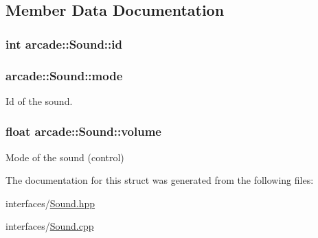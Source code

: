 \subsection{Member Data Documentation}
\hypertarget{structarcade_1_1_sound_a9bee48a44860d44ddb963621ceb9172b}{
\subsubsection[{id}]{ {\bf int} arcade\-::\-Sound\-::id}}\label{structarcade_1_1_sound_a9bee48a44860d44ddb963621ceb9172b}
\hypertarget{structarcade_1_1_sound_a67fc0884cb4d9445ad6c9d9a241a15ef}{
\subsubsection[{mode}]{ arcade\-::\-Sound\-::mode}}\label{structarcade_1_1_sound_a67fc0884cb4d9445ad6c9d9a241a15ef}


Id of the sound. 

\hypertarget{structarcade_1_1_sound_aa80e8832313b76cefcf2e866c4a2e1cc}{
\subsubsection[{volume}]{\setlength{\rightskip}{0pt plus 5cm}float arcade\-::\-Sound\-::volume}}\label{structarcade_1_1_sound_aa80e8832313b76cefcf2e866c4a2e1cc}


Mode of the sound (control) 



The documentation for this struct was generated from the following files\-:\begin{DoxyCompactItemize}
\item 
interfaces/\hyperlink{interfaces_2_sound_8hpp}{Sound.\-hpp}\item 
interfaces/\hyperlink{_sound_8cpp}{Sound.\-cpp}\end{DoxyCompactItemize}
